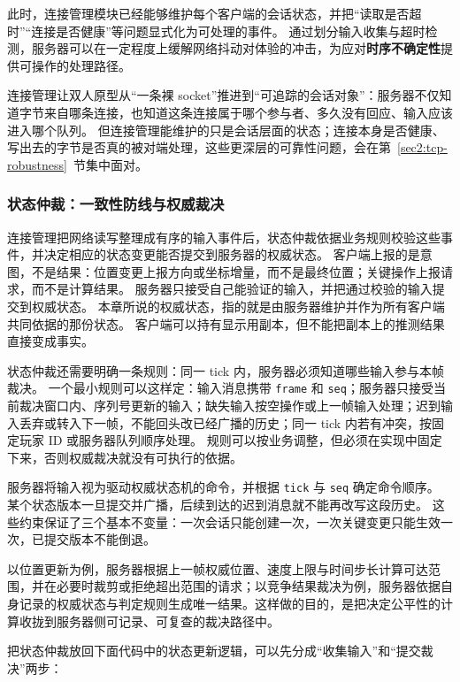 此时，连接管理模块已经能够维护每个客户端的会话状态，并把“读取是否超时”“连接是否健康”等问题显式化为可处理的事件。
通过划分输入收集与超时检测，服务器可以在一定程度上缓解网络抖动对体验的冲击，为应对\textbf{时序不确定性}提供可操作的处理路径。

连接管理让双人原型从“一条裸 socket”推进到“可追踪的会话对象”：服务器不仅知道字节来自哪条连接，也知道这条连接属于哪个参与者、多久没有回应、输入应该进入哪个队列。
但连接管理能维护的只是会话层面的状态；连接本身是否健康、写出去的字节是否真的被对端处理，这些更深层的可靠性问题，会在第~\ref{sec2:tcp-robustness}~节集中面对。


\subsubsection{状态仲裁：一致性防线与权威裁决}\label{sec2:authoritative-arbitration}

连接管理把网络读写整理成有序的输入事件后，状态仲裁依据业务规则校验这些事件，并决定相应的状态变更能否提交到服务器的权威状态。
客户端上报的是意图，不是结果：位置变更上报方向或坐标增量，而不是最终位置；关键操作上报请求，而不是计算结果。
服务器只接受自己能验证的输入，并把通过校验的输入提交到权威状态。
本章所说的权威状态，指的就是由服务器维护并作为所有客户端共同依据的那份状态。
客户端可以持有显示用副本，但不能把副本上的推测结果直接变成事实。

状态仲裁还需要明确一条规则：同一 tick 内，服务器必须知道哪些输入参与本帧裁决。
一个最小规则可以这样定：输入消息携带 \texttt{frame} 和 \texttt{seq}；服务器只接受当前裁决窗口内、序列号更新的输入；缺失输入按空操作或上一帧输入处理；迟到输入丢弃或转入下一帧，不能回头改已经广播的历史；同一 tick 内若有冲突，按固定玩家 ID 或服务器队列顺序处理。
规则可以按业务调整，但必须在实现中固定下来，否则权威裁决就没有可执行的依据。

服务器将输入视为驱动权威状态机的命令，并根据 \texttt{tick} 与 \texttt{seq} 确定命令顺序。
某个状态版本一旦提交并广播，后续到达的迟到消息就不能再改写这段历史。
这些约束保证了三个基本不变量：一次会话只能创建一次，一次关键变更只能生效一次，已提交版本不能倒退。

以位置更新为例，服务器根据上一帧权威位置、速度上限与时间步长计算可达范围，并在必要时裁剪或拒绝超出范围的请求；以竞争结果裁决为例，服务器依据自身记录的权威状态与判定规则生成唯一结果。这样做的目的，是把决定公平性的计算收拢到服务器侧可记录、可复查的裁决路径中。

把状态仲裁放回下面代码中的状态更新逻辑，可以先分成“收集输入”和“提交裁决”两步：

